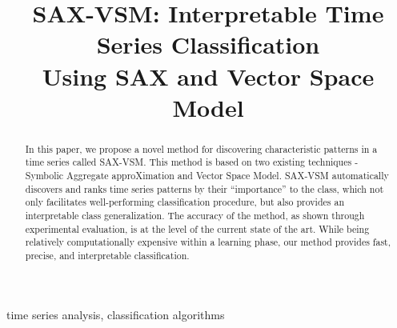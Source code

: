 \documentclass[conference]{IEEEtran}
\begin{document}
%
\title{\huge\textbf{SAX-VSM: Interpretable Time Series Classification\\ Using SAX and Vector Space Model}\vspace{-1ex}}
\author{
 \and
 \vspace{-2ex}}
\bigskip
\maketitle

\bigskip

\begin{abstract}
In this paper, we propose a novel method for discovering characteristic patterns 
in a time series called SAX-VSM. This method is based on two existing techniques - 
Symbolic Aggregate approXimation and Vector Space Model. SAX-VSM automatically 
discovers and ranks time series patterns by their “importance” to the class, which 
not only facilitates well-performing classification procedure, but also provides an 
interpretable class generalization. 
The accuracy of the method, as shown through experimental evaluation, is at the 
level of the current state of the art. 
While being relatively computationally expensive within a learning phase, 
our method provides fast, precise, and interpretable classification.
\end{abstract}
\begin{IEEEkeywords} time series analysis, classification algorithms \end{IEEEkeywords}
\end{document}
